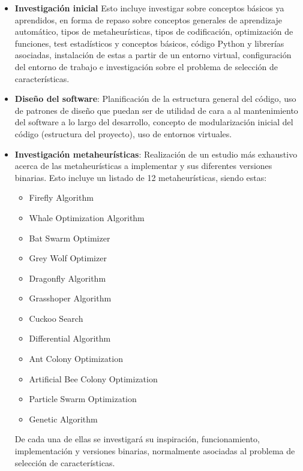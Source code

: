\begin{itemize}
      \item \textbf{Investigación inicial}
            Esto incluye investigar sobre conceptos básicos ya aprendidos, en forma de repaso sobre conceptos generales de aprendizaje automático, tipos de metaheurísticas, tipos de codificación, optimización de funciones, test estadísticos y conceptos básicos, código Python y librerías asociadas, instalación de estas a partir de un entorno virtual, configuración del entorno de trabajo e investigación sobre el problema de selección de características.

      \item \textbf{Diseño del software}: Planificación de la estructura general del código, uso de patrones de diseño que puedan ser de utilidad de cara a al mantenimiento del software a lo largo del desarrollo, concepto de modularización inicial del código (estructura del proyecto), uso de entornos virtuales.
      \item \textbf{Investigación metaheurísticas}: Realización de un estudio más exhaustivo acerca de las metaheurísticas a implementar y sus diferentes versiones binarias. Esto incluye un listado de 12 metaheurísticas, siendo estas:
            \begin{itemize}
                  \item Firefly Algorithm
                  \item Whale Optimization Algorithm
                  \item Bat Swarm Optimizer
                  \item Grey Wolf Optimizer
                  \item Dragonfly Algorithm
                  \item Grasshoper Algorithm
                  \item Cuckoo Search
                  \item Differential Algorithm
                  \item Ant Colony Optimization
                  \item Artificial Bee Colony Optimization
                  \item Particle Swarm Optimization
                  \item Genetic Algorithm
            \end{itemize}
            De cada una de ellas se investigará su inspiración, funcionamiento, implementación y versiones binarias, normalmente asociadas al problema de selección de características.

\end{itemize}
